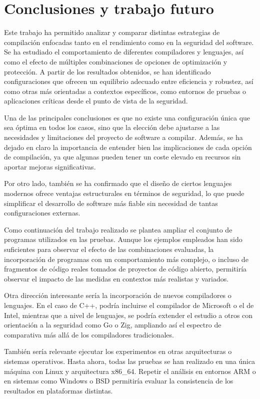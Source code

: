 \chapter{Conclusiones y trabajo futuro}
\label{chap:conclusiones}

Este trabajo ha permitido analizar y comparar distintas estrategias de compilación enfocadas tanto en el rendimiento como en la seguridad del software. Se ha estudiado el comportamiento de diferentes compiladores y lenguajes, así como el efecto de múltiples combinaciones de opciones de optimización y protección. A partir de los resultados obtenidos, se han identificado configuraciones que ofrecen un equilibrio adecuado entre eficiencia y robustez, así como otras más orientadas a contextos específicos, como entornos de pruebas o aplicaciones críticas desde el punto de vista de la seguridad.

Una de las principales conclusiones es que no existe una configuración única que sea óptima en todos los casos, sino que la elección debe ajustarse a las necesidades y limitaciones del proyecto de software a compilar. Además, se ha dejado en claro la importancia de entender bien las implicaciones de cada opción de compilación, ya que algunas pueden tener un coste elevado en recursos sin aportar mejoras significativas.

Por otro lado, también se ha confirmado que el diseño de ciertos lenguajes modernos ofrece ventajas estructurales en términos de seguridad, lo que puede simplificar el desarrollo de software más fiable sin necesidad de tantas configuraciones externas.

Como continuación del trabajo realizado se plantea ampliar el conjunto de programas utilizados en las pruebas. Aunque los ejemplos empleados han sido suficientes para observar el efecto de las combinaciones evaluadas, la incorporación de programas con un comportamiento más complejo, o incluso de fragmentos de código reales tomados de proyectos de código abierto, permitiría observar el impacto de las medidas en contextos más realistas y variados.

Otra dirección interesante sería la incorporación de nuevos compiladores o lenguajes. En el caso de C++, podría incluirse el compilador de Microsoft o el de Intel, mientras que a nivel de lenguajes, se podría extender el estudio a otros con orientación a la seguridad como Go o Zig, ampliando así el espectro de comparativa más allá de los compiladores tradicionales.

También sería relevante ejecutar los experimentos en otras arquitecturas o sistemas operativos. Hasta ahora, todas las pruebas se han realizado en una única máquina con Linux y arquitectura x86\_64. Repetir el análisis en entornos ARM o en sistemas como Windows o BSD permitiría evaluar la consistencia de los resultados en plataformas distintas.

